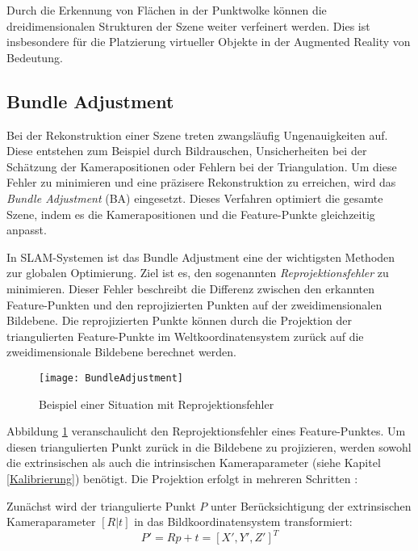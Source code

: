 Durch die Erkennung von Flächen in der Punktwolke können die dreidimensionalen Strukturen der Szene weiter verfeinert werden. Dies ist insbesondere für die Platzierung virtueller Objekte in der Augmented Reality von Bedeutung. \cite{doerner2022virtual}

\subsection{Bundle Adjustment}

Bei der Rekonstruktion einer Szene treten zwangsläufig Ungenauigkeiten auf. Diese entstehen zum Beispiel durch Bildrauschen, Unsicherheiten bei der Schätzung der Kamerapositionen oder Fehlern bei der Triangulation. Um diese Fehler zu minimieren und eine präzisere Rekonstruktion zu erreichen, wird das \textit{Bundle Adjustment} (BA) eingesetzt. Dieses Verfahren optimiert die gesamte Szene, indem es die Kamerapositionen und die Feature-Punkte gleichzeitig anpasst. \cite{gao2021vSLAM}

In SLAM-Systemen ist das Bundle Adjustment eine der wichtigsten Methoden zur globalen Optimierung. Ziel ist es, den sogenannten \textit{Reprojektionsfehler} zu minimieren. Dieser Fehler beschreibt die Differenz zwischen den erkannten Feature-Punkten und den reprojizierten Punkten auf der zweidimensionalen Bildebene. Die reprojizierten Punkte können durch die Projektion der triangulierten Feature-Punkte im Weltkoordinatensystem zurück auf die zweidimensionale Bildebene berechnet werden. \cite{gao2021vSLAM}

\begin{figure}
    \centering
    \texttt{[image: BundleAdjustment]}
    \caption{Beispiel einer Situation mit Reprojektionsfehler \cite{kumar2024bundleAdjustment}\label{fig:BA}}\par
\end{figure}

Abbildung \ref{fig:BA} veranschaulicht den Reprojektionsfehler eines Feature-Punktes. Um diesen triangulierten Punkt zurück in die Bildebene zu projizieren, werden sowohl die extrinsischen als auch die intrinsischen Kameraparameter (siehe Kapitel \ref{Kalibrierung}) benötigt. Die Projektion erfolgt in mehreren Schritten \cite{gao2021vSLAM}:

Zunächst wird der triangulierte Punkt \( P \) unter Berücksichtigung der extrinsischen Kameraparameter \( [R|t] \) in das Bildkoordinatensystem transformiert:
\begin{equation}
    P' = Rp+t = [X', Y', Z']^T
\end{equation}


